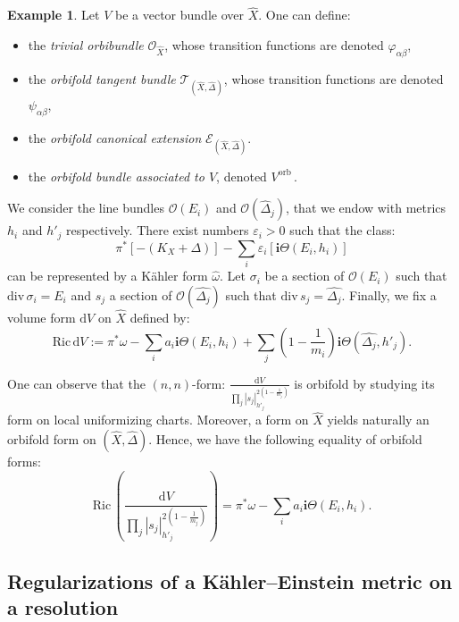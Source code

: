 \documentclass[12pt,a4paper]{amsart}
\newcommand{\orb}{\mathrm{orb}\,}
\newcommand{\Ric}{\mathrm{Ric}\,}
\theoremstyle{plain}
\theoremstyle{definition}
\newtheorem{exem}[theo]{Example}
\begin{document}
\begin{exem}\textup{\cite[Ex.~2.18 and 2.21]{Dai25}}\label{exemple orbibundles}
Let $V$ be a vector bundle over $\widehat{X}$. One can define:
    \begin{itemize}
        \item the \emph{trivial orbibundle} $\mathcal{O}_{\widehat{X}}$, whose transition functions are denoted $\varphi_{\alpha\beta}$,
        \item the \emph{orbifold tangent bundle} $\mathcal{T}_{(\widehat{X}, \widehat{\Delta})}$, whose transition functions are denoted $\psi_{\alpha\beta}$,
        \item the \emph{orbifold canonical extension} $\mathcal{E}_{(\widehat{X}, \widehat{\Delta})}$.
        \item the \emph{orbifold bundle associated to $V$}, denoted $V^\orb$.
    \end{itemize}
\end{exem}

We consider the line bundles $\mathcal{O}(E_i)$ and $\mathcal{O}(\widehat{\Delta}_j)$, that we endow with metrics $h_i$ and $h'_j$ respectively. There exist numbers $\varepsilon_i > 0$ such that the class:
$$
\pi^*\left[ -(K_X + \Delta) \right] - \sum_i \varepsilon_i  \left[ \textbf{i}\Theta(E_i, h_i) \right]
$$
can be represented by a K\"ahler form $\widehat{\omega}$. Let $\sigma_i$ be a section of $\mathcal{O}(E_i)$ such that $\mathrm{div}\, \sigma_i = E_i$ and $s_j$ a section of $\mathcal{O}(\widehat{\Delta_j})$ such that $\mathrm{div}\, s_j = \widehat{\Delta_j}$. Finally, we fix a volume form $\mathrm{d}V$ on $\widehat{X}$ defined by:
$$
\Ric \mathrm{d}V := \pi^*\omega - \sum_i a_i \textbf{i}\Theta(E_i, h_i) + \sum_j \left( 1 - \frac{1}{m_i} \right) \textbf{i}\Theta(\widehat{\Delta_j}, h'_j). 
$$

One can observe that the $(n,n)$-form:
$ \frac{\mathrm{d}V}{\prod_j |s_j|_{h'_j}^{2 \left( 1 - \frac{1}{m_j} \right)}}$
is orbifold by studying its form on local uniformizing charts. Moreover, a form on $\widehat{X}$ yields naturally an orbifold form on $(\widehat{X}, \widehat{\Delta})$. Hence, we have the following equality of orbifold forms:
$$
\Ric \left( \frac{\mathrm{d}V}{\prod_j |s_j|_{h'_j}^{2 \left( 1- \frac{1}{m_j} \right)}} \right) = \pi^*\omega - \sum_i a_i \textbf{i}\Theta(E_i, h_i).
$$



\subsection{Regularizations of a Kähler--Einstein metric on a resolution}
\end{document}
